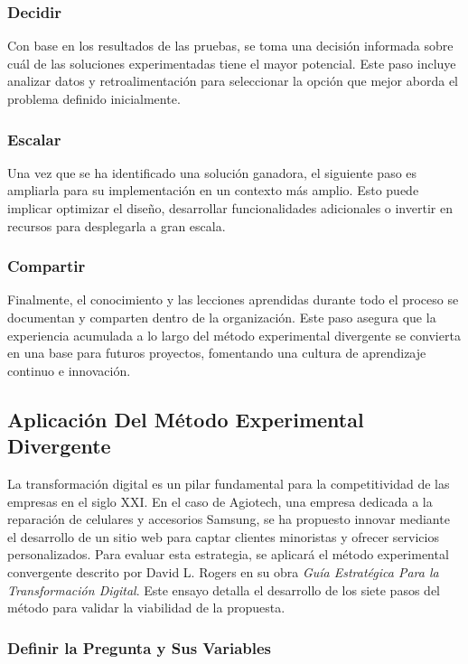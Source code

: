 \subsubsection{Decidir}

Con base en los resultados de las pruebas, se toma una decisión informada sobre
cuál de las soluciones experimentadas tiene el mayor potencial. Este paso incluye
analizar datos y retroalimentación para seleccionar la opción que mejor aborda el
problema definido inicialmente.

\subsubsection{Escalar}

Una vez que se ha identificado una solución ganadora, el siguiente paso es ampliarla
para su implementación en un contexto más amplio. Esto puede implicar optimizar
el diseño, desarrollar funcionalidades adicionales o invertir en recursos para desplegarla
a gran escala.

\subsubsection{Compartir}

Finalmente, el conocimiento y las lecciones aprendidas durante todo el proceso se
documentan y comparten dentro de la organización. Este paso asegura que la
experiencia acumulada a lo largo del método experimental divergente se convierta
en una base para futuros proyectos, fomentando una cultura de aprendizaje continuo
e innovación.

\subsection{Aplicación Del Método Experimental Divergente}

La transformación digital es un pilar fundamental para la competitividad de las
empresas en el siglo XXI. En el caso de Agiotech, una empresa dedicada a la
reparación de celulares y accesorios Samsung, se ha propuesto innovar mediante el
desarrollo de un sitio web para captar clientes minoristas y ofrecer servicios personalizados.
Para evaluar esta estrategia, se aplicará el método experimental convergente descrito
por David L. Rogers en su obra \emph{Guía Estratégica Para la Transformación
	Digital}. Este ensayo detalla el desarrollo de los siete pasos del método para
validar la viabilidad de la propuesta.

\subsubsection{Definir la Pregunta y Sus Variables}

